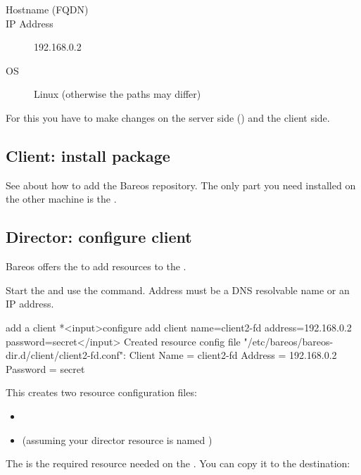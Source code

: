 \begin{description}
  \item[Hostname (FQDN)] 
  \item[IP Address] 192.168.0.2
  \item[OS] Linux (otherwise the paths may differ)
\end{description}

For this you have to make changes on the server side (\bareosDir) and the client side.

\subsection*{Client: install package}

See  about how to add the Bareos repository.
The only part you need installed on the other
machine is the .

\subsection*{Director: configure client}

Bareos  offers the  to add resources to the \bareosDir.

Start the  and use the  command.
Address must be a DNS resolvable name or an IP address.

\begin{bconsole}{add a client}
*<input>configure add client name=client2-fd address=192.168.0.2 password=secret</input>
Created resource config file "/etc/bareos/bareos-dir.d/client/client2-fd.conf":
Client {
  Name = client2-fd
  Address = 192.168.0.2
  Password = secret
}
\end{bconsole}

This creates two resource configuration files:
\begin{itemize}
  \item {}
  \item {} (assuming your director resource is named )
\end{itemize}

The  is the required resource needed on the \bareosFd. You can copy it to the destination:

